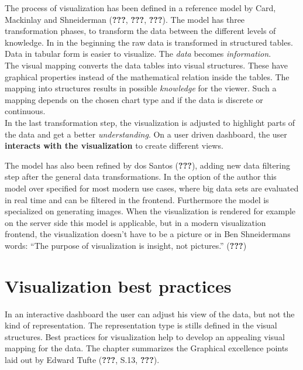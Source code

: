 \documentclass[american,a4paper,oneside,,tablecaptionabove]{scrbook}
\begin{document}
The process of visualization has been defined in a reference model by
Card, Mackinlay and Shneiderman ({\textbf{???}}, \textbf{???},
\textbf{???}). The model has three transformation phases, to transform
the data between the different levels of knowledge. In in the beginning
the raw data is transformed in structured tables. Data in tabular form
is easier to visualize. The \emph{data} becomes \emph{information}.\\
The visual mapping converts the data tables into visual structures.
These have graphical properties instead of the mathematical relation
inside the tables. The mapping into structures results in possible
\emph{knowledge} for the viewer. Such a mapping depends on the chosen
chart type and if the data is discrete or continuous.\\
In the last transformation step, the visualization is adjusted to
highlight parts of the data and get a better \emph{understanding}. On a
user driven dashboard, the user \textbf{interacts with the
visualization} to create different views.

The model has also been refined by dos Santos ({\textbf{???}}), adding
new data filtering step after the general data transformations. In the
option of the author this model over specified for most modern use
cases, where big data sets are evaluated in real time and can be
filtered in the frontend. Furthermore the model is specialized on
generating images. When the visualization is rendered for example on the
server side this model is applicable, but in a modern visualization
frontend, the visualization doesn't have to be a picture or in Ben
Shneidermans words: \enquote{The purpose of visualization is insight,
not pictures.} ({\textbf{???}})

\section{Visualization best
practices}\label{visualization-best-practices}

In an interactive dashboard the user can adjust his view of the data,
but not the kind of representation. The representation type is stills
defined in the visual structures. Best practices for visualization help
to develop an appealing visual mapping for the data. The chapter
summarizes the Graphical excellence points laid out by Edward Tufte
({\textbf{???}}, S.13, \textbf{???}).
\end{document}
